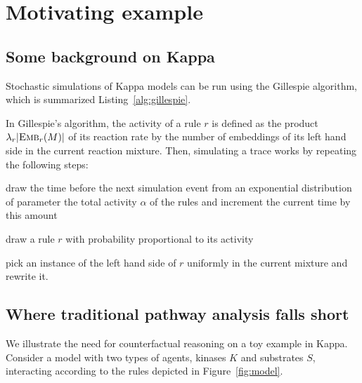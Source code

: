 \section{Motivating example}\label{sec:example}


\subsection{Some background on Kappa}

Stochastic simulations of Kappa models can be run using the Gillespie
algorithm, which is summarized Listing~\ref{alg:gillespie}.



In Gillespie's algorithm, the activity of a rule $r$ is defined as the
product $\lambda_r|{\textsc{Emb}}_{r}(M)|$ of its reaction rate by the number of
embeddings of its left hand side in the current reaction mixture.
Then, simulating a trace works by repeating the following steps:
\begin{inparaenum}[1)]

\item draw the time before the next simulation event from an
  exponential distribution of parameter the total activity $\alpha$ of
  the rules and increment the current time by this amount
\item draw a rule $r$ with probability proportional to its activity
\item pick an instance of the left hand side of $r$ uniformly in the
  current mixture and rewrite it.
\end{inparaenum}



\subsection{Where traditional pathway analysis falls short}


We illustrate the need for counterfactual reasoning on a toy example
in Kappa. Consider a model with two types of agents, kinases $K$ and
substrates $S$, interacting according to the rules depicted in
Figure~\ref{fig:model}.


